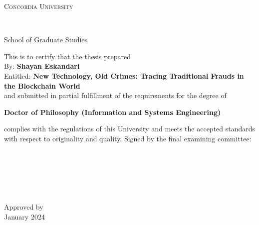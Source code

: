 
\thispagestyle{empty} %

\begin{center}\begin{Large} \textsc{Concordia University} \end{Large} \\
\begin{large} School of Graduate Studies \end{large} \end{center}
\vfill
This is to certify that the thesis prepared\\
By: \tab   \textbf{Shayan Eskandari} \\
Entitled: \tab \textbf{New Technology, Old Crimes: Tracing Traditional Frauds in the Blockchain World}\\
 and submitted in partial fulfillment of the requirements for the degree of
\begin{center}
\textbf{Doctor of Philosophy (Information and Systems Engineering)}
\end{center}
complies with the regulations of this University and meets the
accepted standards with respect to originality and quality.
\vfill
\noindent Signed by the final examining committee: \\[1.3em] %
\hspace*{1cm} \hrulefill {} \\[1.3em]
\hspace*{1cm} \hrulefill {} \\[1.3em]
\hspace*{1cm} \hrulefill {} \\[1.3em]
\hspace*{1cm} \hrulefill {} \\[1.3em]
\hspace*{1cm} \hrulefill {} \\[1.3em]
\hspace*{1cm} \hrulefill {} \\[1.3em]
\vfill
\noindent Approved by \hrulefill \\[1.3em]
 January 2024 \hrulefill \\




